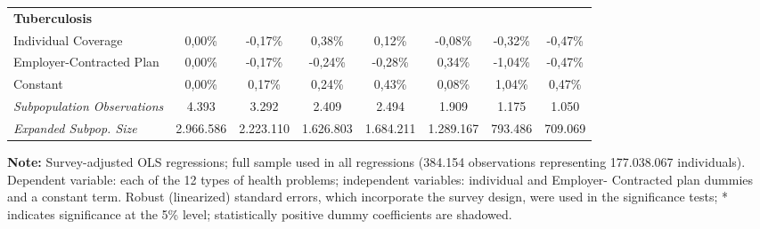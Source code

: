 \documentclass{article}
\begin{document}
\begin{table*}
{\begin{tabular}{l*{7}{c}}
\midrule
\textbf{Tuberculosis} & & & & & & & \\

Individual Coverage & 0,00\% & -0,17\%\sym{*}  & 0,38\% & 0,12\% & -0,08\% & -0,32\% & -0,47\% \\
Employer-Contracted Plan& 0,00\% & -0,17\%\sym{*}  & -0,24\%\sym{*}  & -0,28\% & 0,34\% & -1,04\%\sym{*}  & -0,47\% \\
Constant            & 0,00\% & 0,17\%\sym{*}  & 0,24\%\sym{*}  & 0,43\%\sym{**} & 0,08\% & 1,04\%\sym{*}  & 0,47\% \\


\midrule

\textit{Subpopulation Observations} 	&   4.393         & 3.292        & 2.409        & 2.494         & 1.909       & 1.175      & 1.050         \\
\textit{Expanded Subpop. Size} 		&   2.966.586 & 2.223.110 & 1.626.803 & 1.684.211 & 1.289.167 & 793.486 & 709.069      \\

	\hline \hline

\end{tabular}}

\justify \small {} \textbf{Note:} Survey-adjusted OLS regressions; full sample used in all regressions (384.154 observations representing 177.038.067
individuals). Dependent variable: each of the 12 types of health problems; independent variables: individual and Employer-
Contracted plan dummies and a constant term. Robust (linearized) standard errors, which incorporate the survey design, were
used in the significance tests; * indicates significance at the 5\% level; statistically positive dummy coefficients are shadowed.

\end{table*}
\end{document}

